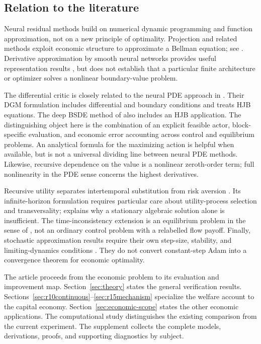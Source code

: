 \subsection{Relation to the literature}
Neural residual methods build on numerical dynamic programming and function approximation, not on a new principle of optimality. Projection and related methods exploit economic structure to approximate a Bellman equation; see \citet{judd1998}. Derivative approximation by smooth neural networks provides useful representation results \citep{hornik1990}, but does not establish that a particular finite architecture or optimizer solves a nonlinear boundary-value problem.

The differential critic is closely related to the neural PDE approach in \citet{sirignano2018}. Their DGM formulation includes differential and boundary conditions and treats HJB equations. The deep BSDE method of \citet{han2018} also includes an HJB application. The distinguishing object here is the combination of an explicit feasible actor, block-specific evaluation, and economic error accounting across control and equilibrium problems. An analytical formula for the maximizing action is helpful when available, but is not a universal dividing line between neural PDE methods. Likewise, recursive dependence on the value is a nonlinear zeroth-order term; full nonlinearity in the PDE sense concerns the highest derivatives.

Recursive utility separates intertemporal substitution from risk aversion \citep{epsteinzin1989,duffieepstein1992}. Its infinite-horizon formulation requires particular care about utility-process selection and transversality; \citet{herdegen2021} explains why a stationary algebraic solution alone is insufficient. The time-inconsistency extension is an equilibrium problem in the sense of \citet{bjork2016}, not an ordinary control problem with a relabelled flow payoff. Finally, stochastic approximation results require their own step-size, stability, and limiting-dynamics conditions \citep{borkar2024}. They do not convert constant-step Adam into a convergence theorem for economic optimality.

The article proceeds from the economic problem to its evaluation and
improvement map. Section~\ref{sec:theory} states the general verification
results. Sections~\ref{sec:r10continuous}--\ref{sec:r15mechanism} specialize
the welfare account to the capital economy. Section~\ref{sec:economic-scope}
states the other economic applications. The computational study distinguishes
the existing comparison from the current experiment. The supplement collects
the complete models, derivations, proofs, and supporting diagnostics by subject.
